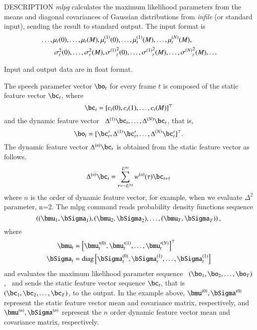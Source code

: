 \begin{qsection}{DESCRIPTION}
	{\em mlpg} calculates the maximum likelihood parameters 
	from the means and diagonal covariances of Gaussian distributions 
	from {\em infile} (or standard input),
	sending the result to standard output.
	The input format is
 \begin{align}
	& \dots, \mu_t(0), \dots, \mu_t(M),
		\mu^{(1)}_t(0), \dots, \mu^{(1)}_t(M),
		\dots, \mu^{(N)}_t(M),
		\notag\\
	& \qquad \sigma^2_t(0), \dots, \sigma^2_t(M),
		{\sigma^{(1)}}^2_t(0), \dots, {\sigma^{(1)}}^2_t(M),
		\dots, {\sigma^{(N)}}^2_t(M),
		\dots \notag
 \end{align}

	Input and output data are in float format.

        The speech parameter vector $\bo_t$ for
        every frame $t$ is composed of the static feature
        vector $\bc_t$, where 
 \begin{displaymath}
	\bc_t = [c_t(0), c_t(1), \dots, c_t(M)]^\top
 \end{displaymath}
	and the dynamic feature vector 
	\ $\Delta^{(1)}\bc_t, \dots, \Delta^{(N)}\bc_t$,
	that is,
 \begin{displaymath}
	\bo_t = [\bc_t', \Delta^{(1)}\bc_t', \dots, \Delta^{(N)}\bc_t']^\top.
 \end{displaymath}
        The dynamic feature vector $\Delta^{(n)}\bc_t$ is
        obtained from the static feature vector as follows.
 \begin{displaymath}
	\Delta^{(n)}\bc_t 
	= \sum_{\tau=-L^{(n)}}^{L^{(n)}} w^{(n)}(\tau)\bc_{t+\tau}
 \end{displaymath}
        where $n$ is the order of dynamic feature vector, for
        example, when we evaluate $\Delta^2$ parameter, n=2.
        The mlpg command reads probability density functions
	sequence
\begin{displaymath}
	\left((\bmu_1, \bSigma_1), (\bmu_2, \bSigma_2), \dots, (\bmu_T, \bSigma_T)
	\right),
\end{displaymath}
where
 \begin{align}
	\bmu_t 
	& =  \left[\bmu^{\prime(0)}_t, \bmu^{\prime(1)}_t, 
		\dots, \bmu^{\prime(N)}_t\right]^\top
		\notag \\
	\bSigma_t 
	& = \diag \left[ \bSigma^{(0)}_t, \bSigma^{(1)}_t, \dots, \bSigma^{(1)}_t \right]
		\notag
 \end{align}
	and evaluates the maximum likelihood parameter sequence
	\ $(\bo_1, \bo_2, \dots, \bo_T)$,
	\ and sends the static feature vector sequence $\bc_t$,
        that is
	\ $(\bc_1, \bc_2, \dots, \bc_T)$,
	to the output.
	In the example above,
	$\bmu^{(0)}, \bSigma^{(0)}$ represent the static feature vector
        mean and covariance matrix, respectively,
        and $\bmu^{(n)}, \bSigma^{(n)}$ represent the $n$ order dynamic
        feature vector mean and covariance matrix, respectively.
\end{qsection}

